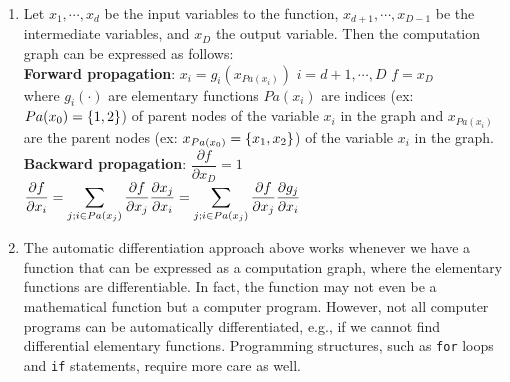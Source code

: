 \begin{enumerate}
    \item Let $x_1, \cdots , x_d$ be the input variables to the function, $x_{d+1}, \cdots , x_{D-1}$ be the intermediate variables, and $x_D$ the output variable. Then the computation graph can be expressed as follows:
    \hfill \cite{mfml/book/mml/Deisenroth-Faisal-Ong}
    \\
    \textbf{Forward propagation}:\hfill
    $x_i = g_i(x_{Pa(x_i)})$
    \hspace{1cm}
    $i = d+1, \cdots, D$
    \hspace{1cm}
    $f = x_D$
    \hfill \cite{mfml/book/mml/Deisenroth-Faisal-Ong}
    \\
    where
    $g_i(\cdot)$ are elementary functions
    $Pa(x_i)$ are indices (ex: $Pa(x_0) = \left\{1, 2\right\}$) of parent nodes of the variable $x_i$ in the graph
    and
    $x_{Pa(x_i)}$ are the parent nodes (ex: $x_{Pa(x_0)} = \left\{x_1, x_2\right\}$) of the variable $x_i$ in the graph.
    \hfill \cite{mfml/book/mml/Deisenroth-Faisal-Ong}
    \\
    \textbf{Backward propagation}:\hfill
    $\dfrac{\partial f}{\partial x_D} = 1$
    \hspace{1cm}
    $
        \dfrac{\partial f}{\partial x_i}
        = \displaystyle\sum_{j; i \in Pa(x_j)} \dfrac{\partial f}{\partial x_j} \dfrac{\partial x_j}{\partial x_i}
        = \displaystyle\sum_{j; i \in Pa(x_j)} \dfrac{\partial f}{\partial x_j} \dfrac{\partial g_j}{\partial x_i}
    $
    \hfill \cite{mfml/book/mml/Deisenroth-Faisal-Ong}


    \item The automatic differentiation approach above works whenever we have a function that can be expressed as a computation graph, where the elementary functions are differentiable.
    In fact, the function may not even be a mathematical function but a computer program.
    However, not all computer programs can be automatically differentiated, e.g., if we cannot find differential elementary functions.
    Programming structures, such as \verb|for| loops and \verb|if| statements, require more care as well.
    \hfill \cite{mfml/book/mml/Deisenroth-Faisal-Ong}








\end{enumerate}
